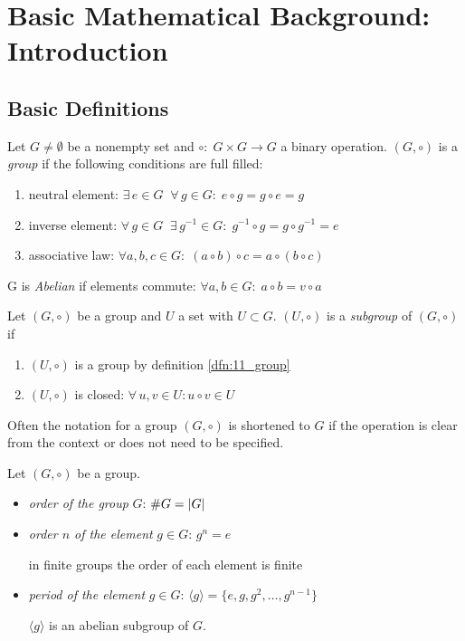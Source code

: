 \newpage
\section{Basic Mathematical Background: Introduction}

\subsection{Basic Definitions}

\begin{dfn}[Group]\label{dfn:11_group}
Let $G \neq \emptyset $ be a nonempty set and $\circ: \; G \times G \rightarrow G$ a  binary operation. $(G, \circ)$ is a \textit{group} if the following conditions are full filled:
\begin{enumerate}
    \item neutral element: $\exists \, e\in G \; \; \forall \, g \in G: \; e \circ g = g \circ e = g$
    \item inverse element: $\forall \, g \in G \; \; \exists \, g^{-1} \in G: \; g^{-1} \circ g = g \circ g^{-1} = e$
    \item associative law: $\forall a,b,c \in G: \; \left(a \circ b \right) \circ c = a \circ \left(b \circ c \right)$
\end{enumerate}

\noindent G is \textit{Abelian} if elements commute: $\forall a,b \in G: \; a \circ b = v \circ a$
\end{dfn}

\begin{dfn}[Subgroup]\label{dfn:12_subgroup}
Let $(G, \circ)$ be a group and $U$ a set with $U \subset G$. $(U, \circ)$ is a \textit{subgroup} of $(G, \circ)$ if
\begin{enumerate}
    \item $(U, \circ)$ is a group by definition \ref{dfn:11_group}
    \item $(U, \circ)$ is closed: $\forall \, u,v \in U: u \circ v \in U$
\end{enumerate}
\end{dfn}

Often the notation for a group $(G, \circ)$ is shortened to $G$ if the operation is clear from the context or does not need to be specified.

\begin{dfn}\label{dfn:13_order}
Let $(G, \circ)$ be a group. 
\begin{itemize}
    \item \textit{order of the group} $G$: $\# G = \left| G \right|$
    \item \textit{order $n$ of the element} $g \in G$: $g^n = e$ \par in finite groups the order of each element is finite
    \item \textit{period of the element} $g \in G$: $\langle g \rangle = \lbrace e, g, g^2, \dots, g^{n-1} \rbrace$ \par $\langle g \rangle$ is an abelian subgroup of $G$.
\end{itemize}
\end{dfn}

